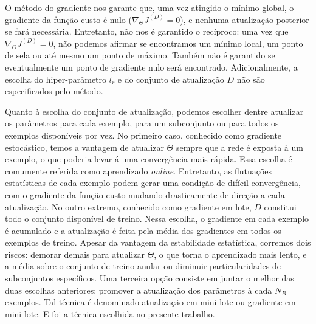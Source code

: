 O método do gradiente nos garante que, uma vez atingido o mínimo global, o gradiente da função custo é nulo ($\nabla_{\Theta} J^{(D)} = 0$), e nenhuma atualização posterior se fará necessária. Entretanto, não nos é garantido o recíproco: uma vez que $\nabla_{\Theta} J^{(D)} = 0$, não podemos afirmar se encontramos um mínimo local, um ponto de sela ou até mesmo um ponto de máximo. Também não é garantido se eventualmente um ponto de gradiente nulo será encontrado. Adicionalmente, a escolha do hiper-parâmetro $l_r$ e do conjunto de atualização $D$ não são especificados pelo método.

Quanto à escolha do conjunto de atualização, podemos escolher dentre atualizar os parâmetros para cada exemplo, para um subconjunto ou para todos os exemplos disponíveis por vez. No primeiro caso, conhecido como gradiente estocástico, temos a vantagem de atualizar $\Theta$ sempre que a rede é exposta à um exemplo, o que poderia levar á uma convergência mais rápida. Essa escolha é comumente referida como aprendizado \textit{online}. Entretanto, as flutuações estatísticas de cada exemplo podem gerar uma condição de difícil convergência, com o gradiente da função custo mudando drasticamente de direção a cada atualização. No outro extremo, conhecido como gradiente em lote, $D$ constitui todo o conjunto disponível de treino. Nessa escolha, o gradiente em cada exemplo é acumulado e a atualização é feita pela média dos gradientes em todos os exemplos de treino. Apesar da vantagem da estabilidade estatística, corremos dois riscos: demorar demais para atualizar $\Theta$, o que torna o aprendizado mais lento, e a média sobre o conjunto de treino anular ou diminuir particularidades de subconjuntos específicos. Uma terceira opção consiste em juntar o melhor das duas escolhas anteriores: promover a atualização dos parâmetros à cada $N_B$ exemplos. Tal técnica é denominado atualização em mini-lote ou gradiente em mini-lote. E foi a técnica escolhida no presente trabalho.  

